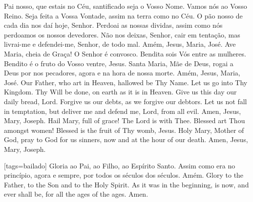   \beginverse
    Pai nosso,
    que estais no Céu,
    santificado seja o Vosso Nome.
    Vamos nós ao Vosso Reino.
    Seja feita a Vossa Vontade,
    assim na terra como no Céu.
    O pão nosso de cada dia nos daí hoje, Senhor.
    Perdoai as nossas dividas,
    assim como nós perdoamos os nossos devedores.
    Não nos deixas, Senhor, cair em tentação,
    mas livrai-me e defendei-me, Senhor,
    de todo mal.
    \preceparspace
    Amém, Jesus, Maria, José.
  \endverse
  \beginverse
    Ave Maria,
    cheia de Graça!
    O Senhor é convosco.
    Bendita sois Vós entre as mulheres.
    Bendito é o fruto do Vosso ventre, Jesus.
    Santa Maria, Mãe de Deus,
    rogai a Deus por nos pecadores,
    agora e na hora de nossa morte.
    \preceparspace
    Amém, Jesus, Maria, José.
  \endverse
  \forcebrk\vspace*{\fill}
  \beginverse\color{englishcolor}
    Our Father,
    who art in Heaven,
    hallowed be Thy Name.
    Let us go into Thy Kingdom.
    Thy Will be done,
    on earth as it is in Heaven.
    Give us this day our daily bread, Lord.
    Forgive us our debts,
    as we forgive our debtors.
    Let us not fall in temptation,
    but deliver me and defend me, Lord,
    from all evil.
    \preceparspace
    Amen, Jesus, Mary, Joseph.
  \endverse
  \beginverse\color{englishcolor}
    Hail Mary,
    full of grace!
    The Lord is with Thee.
    Blessed art Thou amongst women!
    Blessed is the fruit of Thy womb, Jesus.
    Holy Mary, Mother of God,
    pray to God for us sinners,
    now and at the hour of our death.
    \preceparspace
    Amen, Jesus, Mary, Joseph.
  \endverse
  \vspace*{\fill}
\endsong


[tags={bailado}]
  \beginverse
    \preceparspace
    Gloria ao Pai, ao Filho, ao Espírito Santo.
    Assim como era no princípio, agora e sempre,
    por todos os séculos dos séculos.
    \preceparspace
    Amém.
  \endverse
  \beginverse\color{englishcolor}
    \preceparspace
    Glory to the Father, to the Son and to the Holy Spirit.
    As it was in the beginning, is now, and ever shall be,
    for all the ages of the ages.
    \preceparspace
    Amen.
  \endverse
\endsong


